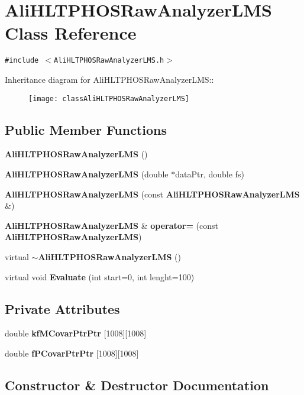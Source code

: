 \section{Ali\-HLTPHOSRaw\-Analyzer\-LMS Class Reference}
\label{classAliHLTPHOSRawAnalyzerLMS}
{\tt \#include $<$Ali\-HLTPHOSRaw\-Analyzer\-LMS.h$>$}

Inheritance diagram for Ali\-HLTPHOSRaw\-Analyzer\-LMS::\begin{figure}[H]
\begin{center}
\leavevmode
\texttt{[image: classAliHLTPHOSRawAnalyzerLMS]}
\end{center}
\end{figure}
\subsection*{Public Member Functions}
\begin{CompactItemize}
\item 
{\bf Ali\-HLTPHOSRaw\-Analyzer\-LMS} ()
\item 
{\bf Ali\-HLTPHOSRaw\-Analyzer\-LMS} (double $\ast$data\-Ptr, double fs)
\item 
{\bf Ali\-HLTPHOSRaw\-Analyzer\-LMS} (const {\bf Ali\-HLTPHOSRaw\-Analyzer\-LMS} \&)
\item 
{\bf Ali\-HLTPHOSRaw\-Analyzer\-LMS} \& {\bf operator=} (const {\bf Ali\-HLTPHOSRaw\-Analyzer\-LMS})
\item 
virtual {\bf $\sim$Ali\-HLTPHOSRaw\-Analyzer\-LMS} ()
\item 
virtual void {\bf Evaluate} (int start=0, int lenght=100)
\end{CompactItemize}
\subsection*{Private Attributes}
\begin{CompactItemize}
\item 
double {\bf kf\-MCovar\-Ptr\-Ptr} [1008][1008]
\item 
double {\bf f\-PCovar\-Ptr\-Ptr} [1008][1008]
\end{CompactItemize}


\subsection{Constructor \& Destructor Documentation}
